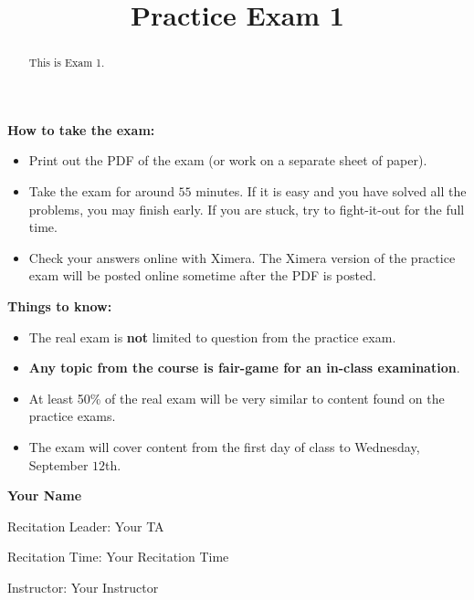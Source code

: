 \documentclass{ximera}
\title{Practice Exam 1}
\begin{document}
\begin{abstract}
This is Exam 1.
\end{abstract}
\maketitle

\thispagestyle{empty}


\vfill

\textbf{How to take the exam:}
\begin{itemize}
  \item Print out the PDF of the exam (or work on a separate sheet of paper).
  \item Take the exam for around $55$ minutes. If it is easy and you
    have solved all the problems, you may finish early. If you are
    stuck, try to fight-it-out for the full time.
  \item Check your answers online with Ximera. The Ximera version of
    the practice exam will be posted online sometime after the PDF is
    posted.
\end{itemize}

\textbf{Things to know:}
\begin{itemize}
\item The real exam is \textbf{not} limited to question from the practice
  exam.
\item \textbf{Any topic from the course is fair-game for an in-class
  examination}.
\item At least 50\% of the real exam will be very similar to content
  found on the practice exams.
\item The exam will cover content from the first day of class to Wednesday, September $12$th.
\end{itemize}

\noindent\textsf{{\fontsize{32}{36}\textbf{Your Name}}} 

\vspace{1cm}

\noindent\textsf{\large Recitation Leader: Your TA} 


\noindent\textsf{\large Recitation Time: Your Recitation Time} 


\noindent\textsf{\large Instructor: Your Instructor}


\end{document}
